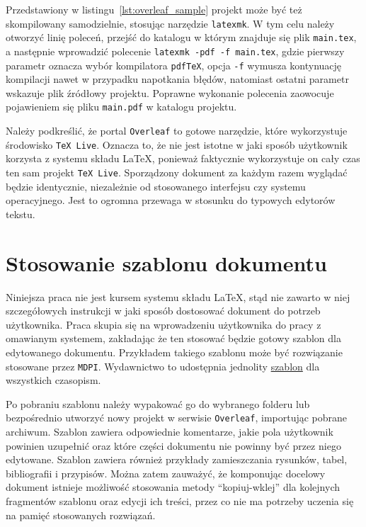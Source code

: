 Przedstawiony w listingu~\ref{lst:overleaf_sample} projekt może być też skompilowany samodzielnie, stosując narzędzie \texttt{latexmk}. W tym celu należy otworzyć linię poleceń, przejść do katalogu w którym znajduje się plik \texttt{main.tex}, a następnie wprowadzić polecenie \texttt{latexmk -pdf -f main.tex}, gdzie pierwszy parametr oznacza wybór kompilatora \texttt{pdfTeX}, opcja \texttt{-f} wymusza kontynuację kompilacji nawet w przypadku napotkania błędów, natomiast ostatni parametr wskazuje plik źródłowy projektu. Poprawne wykonanie polecenia zaowocuje pojawieniem się pliku \texttt{main.pdf} w katalogu projektu.

Należy podkreślić, że portal \texttt{Overleaf} to gotowe narzędzie, które wykorzystuje środowisko \texttt{TeX Live}. Oznacza to, że nie jest istotne w jaki sposób użytkownik korzysta z systemu składu \LaTeX{}, ponieważ faktycznie wykorzystuje on cały czas ten sam projekt \texttt{TeX Live}. Sporządzony dokument za każdym razem wyglądać będzie identycznie, niezależnie od stosowanego interfejsu czy systemu operacyjnego. Jest to ogromna przewaga w stosunku do typowych edytorów tekstu.

\section{Stosowanie szablonu dokumentu}

Niniejsza praca nie jest kursem systemu składu \LaTeX{}, stąd nie zawarto w niej szczegółowych instrukcji w jaki sposób dostosować dokument do potrzeb użytkownika. Praca skupia się na wprowadzeniu użytkownika do pracy z omawianym systemem, zakładając że ten stosować będzie gotowy szablon dla edytowanego dokumentu. Przykładem takiego szablonu może być rozwiązanie stosowane przez \texttt{MDPI}. Wydawnictwo to udostępnia jednolity \href{https://www.mdpi.com/authors/latex}{szablon} dla wszystkich czasopism.

Po pobraniu szablonu należy wypakować go do wybranego folderu lub bezpośrednio utworzyć nowy projekt w serwisie \texttt{Overleaf}, importując pobrane archiwum. Szablon zawiera odpowiednie komentarze, jakie pola użytkownik powinien uzupełnić oraz które części dokumentu nie powinny być przez niego edytowane. Szablon zawiera również przykłady zamieszczania rysunków, tabel, bibliografii i przypisów. Można zatem zauważyć, że komponując docelowy dokument istnieje możliwość stosowania metody \enquote{kopiuj-wklej} dla kolejnych fragmentów szablonu oraz edycji ich treści, przez co nie ma potrzeby uczenia się na pamięć stosowanych rozwiązań.

